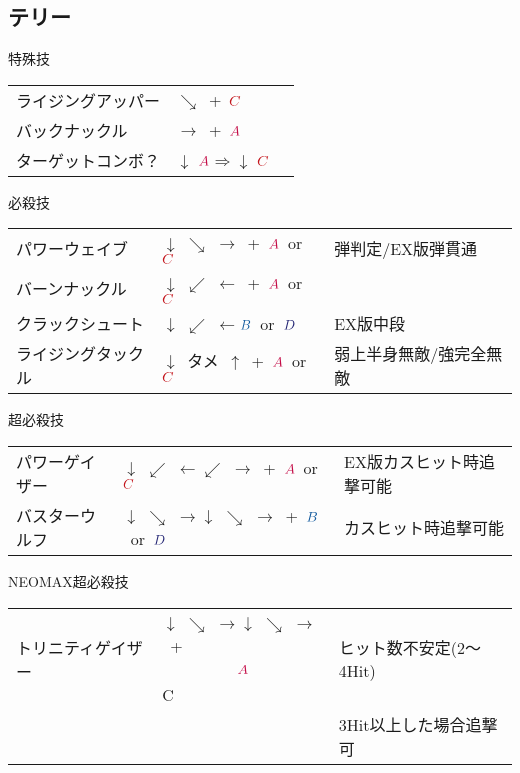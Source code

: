 \documentclass[a4j,11pt]{jarticle}
\def\A{$\textcolor{Acolor}{A}$}
\def\C{$\textcolor{Ccolor}{C}$}
\def\B{$\textcolor{Bcolor}{B}$}
\def\D{$\textcolor{Dcolor}{D}$}
\def\hado{$\downarrow$ $\searrow$ $\rightarrow$}%
\def\tatsu{$\downarrow$ $\swarrow$ $\leftarrow$}%
\def\Cancel{$\Longrightarrow$}
\begin{document}
\subsection{テリー}
\begin{itembox}[l]{特殊技}
\begin{tabular}{lll}
ライジングアッパー&$\searrow$\ +\ \C&\\
バックナックル&$\rightarrow$\ +\ \A&\\
ターゲットコンボ？&$\downarrow$ \A \Cancel $\downarrow$ \C
\end{tabular}
\end{itembox}
\begin{itembox}[l]{必殺技}
\begin{tabular}{lll}
パワーウェイブ&\hado\ +\ \A\ or\ \C&弾判定/EX版弾貫通\\
バーンナックル&\tatsu\ +\ \A\ or\ \C&\\
クラックシュート&\tatsu \B\ or\ \D&EX版中段\\
ライジングタックル&$\downarrow$\ タメ\ $\uparrow$\ +\ \A\ or\ \C&弱上半身無敵/強完全無敵
\end{tabular}
\end{itembox}
\begin{itembox}[l]{超必殺技}
\begin{tabular}{lll}
パワーゲイザー&\tatsu $\swarrow$ $\rightarrow$\ +\ \A\ or\ \C&EX版カスヒット時追撃可能\\
バスターウルフ&\hado\hado\ +\ \B\ or\ \D&カスヒット時追撃可能
\end{tabular}
\end{itembox}
\begin{itembox}[l]{NEOMAX超必殺技}
\begin{tabular}{lll}
トリニティゲイザー&\hado\hado\ +$\A\C$&ヒット数不安定(2～4Hit)\\
&&3Hit以上した場合追撃可
\end{tabular}
\end{itembox}
\newpage
\end{document}
